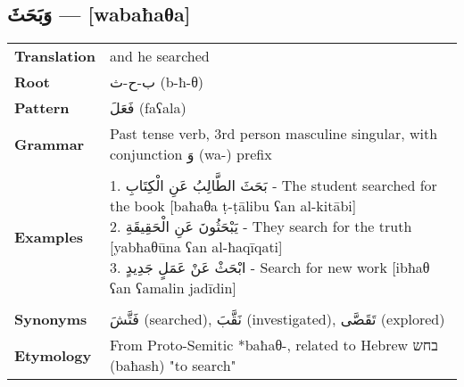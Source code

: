 \documentclass[letter,12pt]{article}
\begin{document}
\subsection{\textarabic{وَبَحَثَ} — [wabaħaθa]}
\begin{tabular}{p{3cm}p{10cm}}
\toprule

\textbf{Translation} & and he searched \\
\textbf{Root} & \textarabic{ب-ح-ث} (b-ħ-θ) \\
\textbf{Pattern} & \textarabic{فَعَلَ} (faʕala) \\
\textbf{Grammar} & Past tense verb, 3rd person masculine singular, with conjunction \textarabic{وَ} (wa-) prefix \\
\midrule \\
\textbf{Examples} & \makecell[l]{\parbox{9.5cm}{
1. \textarabic{بَحَثَ الطَّالِبُ عَنِ الْكِتَابِ} - The student searched for the book [baħaθa ṭ-ṭālibu ʕan al-kitābi]\\
2. \textarabic{يَبْحَثُونَ عَنِ الْحَقِيقَةِ} - They search for the truth [yabħaθūna ʕan al-ħaqīqati]\\
3. \textarabic{ابْحَثْ عَنْ عَمَلٍ جَدِيدٍ} - Search for new work [ibħaθ ʕan ʕamalin jadīdin]
} } \\
\midrule \\
\textbf{Synonyms} & \textarabic{فَتَّشَ} (searched), \textarabic{نَقَّبَ} (investigated), \textarabic{تَقَصَّى} (explored) \\
\textbf{Etymology} & From Proto-Semitic *baħaθ-, related to Hebrew \texthebrew{בחש} (baħash) "to search" \\
\bottomrule
\end{tabular}
\end{document}
